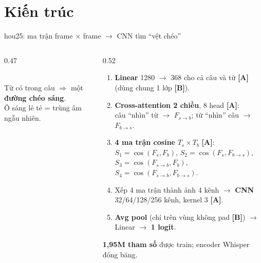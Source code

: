 \documentclass[aspectratio=169,xcolor=table]{beamer}
\newcommand{\hi}[1]{\textcolor{Primary}{\textbf{#1}}}
\begin{document}
\section{Kiến trúc}
\begin{frame}{hou25: ma trận frame $\times$ frame $\rightarrow$ CNN tìm ``vệt chéo''}
\begin{columns}[T]
\begin{column}{0.47\textwidth}
\centering
{}\\[2pt]
{\scriptsize Từ có trong câu $\Rightarrow$ một \textbf{đường chéo sáng}.\\Ô sáng lẻ tẻ = trùng âm ngẫu nhiên.}
\end{column}
\begin{column}{0.52\textwidth}
\footnotesize
\begin{enumerate}\itemsep3pt
\item \textbf{Linear} 1280 $\rightarrow$ 368 cho cả câu và từ \hi{[A]} (dùng chung 1 lớp \hi{[B]}).
\item \textbf{Cross-attention 2 chiều}, 8 head \hi{[A]}:\\câu ``nhìn'' từ $\rightarrow$ $F_{s\to b}$; từ ``nhìn'' câu $\rightarrow$ $F_{b\to s}$.
\item \textbf{4 ma trận cosine} $T_s\times T_b$ \hi{[A]}:\\
$S_1{=}\cos(F_s,F_b)$, $S_2{=}\cos(F_s,F_{b\to s})$,\\$S_3{=}\cos(F_{s\to b},F_b)$, $S_4{=}\cos(F_{s\to b},F_{b\to s})$.
\item Xếp 4 ma trận thành ảnh 4 kênh $\rightarrow$ \textbf{CNN} 32/64/128/256 kênh, kernel 3 \hi{[A]}.
\item \textbf{Avg pool} (chỉ trên vùng không pad \hi{[B]}) $\rightarrow$ Linear $\rightarrow$ \textbf{1 logit}.
\end{enumerate}
\vspace{2pt}
\textbf{1,95M tham số} được train; encoder Whisper đóng băng.
\end{column}
\end{columns}
\end{frame}
\end{document}
